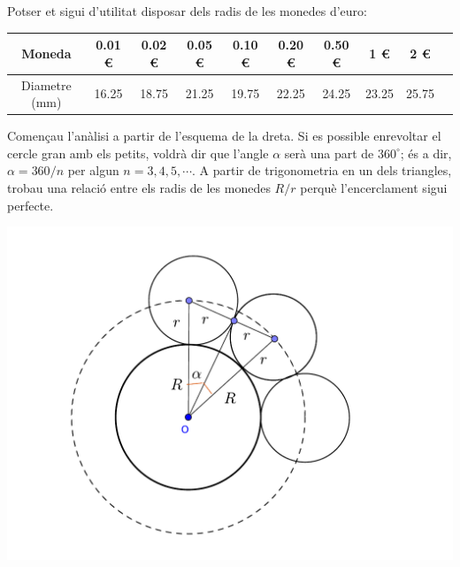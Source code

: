 Potser et sigui d'utilitat disposar dels radis de les monedes d'euro:
\begin{center}
\begin{tabular}{|c|c|c|c|c|c|c|c|c|c|}
	\hline 
	Moneda & 0.01 €  & 0.02 € & 0.05 € & 0.10 € & 0.20 € & 0.50 € & 1 € & 2 €\\ 
	\hline 
	Diametre (mm) & 16.25  & 18.75  & 21.25 & 19.75 & 22.25 & 24.25  & 23.25 & 25.75 \\ 
	\hline 
\end{tabular}
\end{center} 


\begin{minipage}{0.65\textwidth}
	Començau l'anàlisi a partir de l'esquema de la dreta. Si es possible enrevoltar el cercle gran amb els petits, voldrà dir que l'angle $\alpha$ serà una part de $360^\circ$; és a dir,  $\alpha=360 / n$ per algun $n=3,4,5,\cdots$. A partir de trigonometria en un dels triangles, trobau una relació entre els radis de les monedes $R/r$ perquè l'encerclament sigui perfecte. 
\end{minipage}
\begin{minipage}{0.35\textwidth}
	\includegraphics*[width=\textwidth]{img-03/chap-trig-monedes-scheme}
\end{minipage}

\newpage
 
\resum

